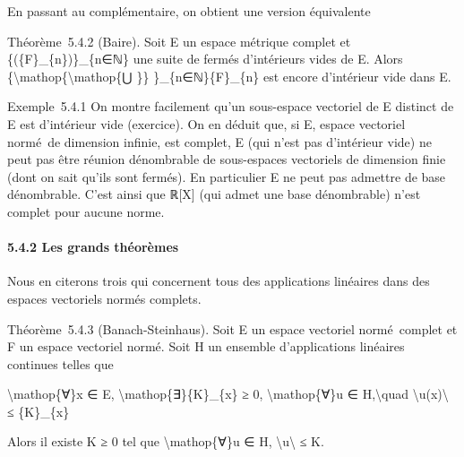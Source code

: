 \documentclass[]{article}
\begin{document}
En passant au complémentaire, on obtient une version équivalente

Théorème~5.4.2 (Baire). Soit E un espace métrique complet et
\{(\{F\}\_\{n\})\}\_\{n∈ℕ\} une suite de fermés d'intérieurs vides de E.
Alors \{\textbackslash{}mathop\{\textbackslash{}mathop\{⋃ \}\}
\}\_\{n∈ℕ\}\{F\}\_\{n\} est encore d'intérieur vide dans E.

Exemple~5.4.1 On montre facilement qu'un sous-espace vectoriel de E
distinct de E est d'intérieur vide (exercice). On en déduit que, si E,
espace vectoriel normé~de dimension infinie, est complet, E (qui n'est
pas d'intérieur vide) ne peut pas être réunion dénombrable de
sous-espaces vectoriels de dimension finie (dont on sait qu'ils sont
fermés). En particulier E ne peut pas admettre de base dénombrable.
C'est ainsi que ℝ{[}X{]} (qui admet une base dénombrable) n'est complet
pour aucune norme.

\paragraph{5.4.2 Les grands théorèmes}

Nous en citerons trois qui concernent tous des applications linéaires
dans des espaces vectoriels normés complets.

Théorème~5.4.3 (Banach-Steinhaus). Soit E un espace vectoriel
normé~complet et F un espace vectoriel normé. Soit H un ensemble
d'applications linéaires continues telles que

\textbackslash{}mathop\{∀\}x ∈ E,
\textbackslash{}mathop\{∃\}\{K\}\_\{x\} ≥ 0,
\textbackslash{}mathop\{∀\}u ∈ H,\textbackslash{}quad
\textbackslash{}\textbar{}u(x)\textbackslash{}\textbar{} ≤ \{K\}\_\{x\}

Alors il existe K ≥ 0 tel que \textbackslash{}mathop\{∀\}u ∈ H,
\textbackslash{}\textbar{}u\textbackslash{}\textbar{} ≤ K.
\end{document}
